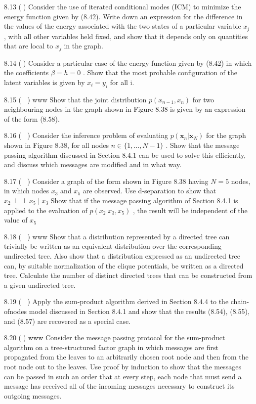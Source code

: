 \documentclass[
  10
]{article}
\begin{document}
8.13 () Consider the use of iterated conditional modes (ICM) to minimize
the energy function given by (8.42). Write down an expression for the
difference in the values of the energy associated with the two states of
a particular variable \(x _ { j }\) , with all other variables held
fixed, and show that it depends only on quantities that are local to
\(x _ { j }\) in the graph.

8.14 () Consider a particular case of the energy function given by
(8.42) in which the coefficients \(\beta = h = 0\) . Show that the most
probable configuration of the latent variables is given by
\(x _ { i } = y _ { i }\) for all i.

8.15 ( ) www Show that the joint distribution
\(p ( x _ { n - 1 } , x _ { n } )\) for two neighbouring nodes in the
graph shown in Figure 8.38 is given by an expression of the form (8.58).

8.16 ( ) Consider the inference problem of evaluating
\(p ( \mathbf { x } _ { n } | \mathbf { x } _ { N } )\) for the graph
shown in Figure 8.38, for all nodes \(n \in \{ 1 , \ldots , N - 1 \}\) .
Show that the message passing algorithm discussed in Section 8.4.1 can
be used to solve this efficiently, and discuss which messages are
modified and in what way.

8.17 ( ) Consider a graph of the form shown in Figure 8.38 having
\(N = 5\) nodes, in which nodes \(x _ { 3 }\) and \(x _ { 5 }\) are
observed. Use d-separation to show that
\(x _ { 2 } \perp \perp x _ { 5 } \mid x _ { 3 }\) Show that if the
message passing algorithm of Section 8.4.1 is applied to the evaluation
of \(p ( x _ { 2 } | x _ { 3 } , x _ { 5 } )\) , the result will be
independent of the value of \(x _ { 5 }\)

8.18 ( ) www Show that a distribution represented by a directed tree can
trivially be written as an equivalent distribution over the
corresponding undirected tree. Also show that a distribution expressed
as an undirected tree can, by suitable normalization of the clique
potentials, be written as a directed tree. Calculate the number of
distinct directed trees that can be constructed from a given undirected
tree.

8.19 ( ) Apply the sum-product algorithm derived in Section 8.4.4 to the
chain-ofnodes model discussed in Section 8.4.1 and show that the results
(8.54), (8.55), and (8.57) are recovered as a special case.

8.20 () www Consider the message passing protocol for the sum-product
algorithm on a tree-structured factor graph in which messages are first
propagated from the leaves to an arbitrarily chosen root node and then
from the root node out to the leaves. Use proof by induction to show
that the messages can be passed in such an order that at every step,
each node that must send a message has received all of the incoming
messages necessary to construct its outgoing messages.
\end{document}
